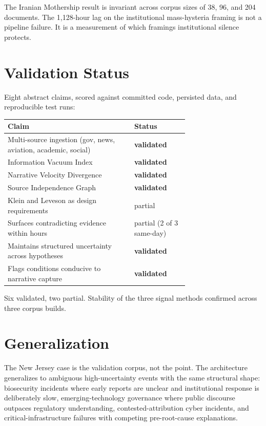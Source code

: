\documentclass[10pt, letterpaper]{article}
\begin{document}
The Iranian Mothership result is invariant across corpus sizes of 38, 96, and 204 documents.
The 1{,}128-hour lag on the institutional mass-hysteria framing is not a pipeline failure.
It is a measurement of which framings institutional silence protects.

\section{Validation Status}

Eight abstract claims, scored against committed code, persisted data, and reproducible test runs:

\begin{table}[h]
\renewcommand{\arraystretch}{1.1}
\small
\begin{tabular}{@{}p{0.7\linewidth} l@{}}
  \toprule
  \textbf{Claim} & \textbf{Status} \\
  \midrule
  Multi-source ingestion (gov, news, aviation, academic, social) & \textbf{validated} \\
  Information Vacuum Index & \textbf{validated} \\
  Narrative Velocity Divergence & \textbf{validated} \\
  Source Independence Graph & \textbf{validated} \\
  Klein and Leveson as design requirements & partial \\
  Surfaces contradicting evidence within hours & partial (2 of 3 same-day) \\
  Maintains structured uncertainty across hypotheses & \textbf{validated} \\
  Flags conditions conducive to narrative capture & \textbf{validated} \\
  \bottomrule
\end{tabular}
\end{table}

Six validated, two partial.
Stability of the three signal methods confirmed across three corpus builds.

\section{Generalization}

The New Jersey case is the validation corpus, not the point.
The architecture generalizes to ambiguous high-uncertainty events with the same structural shape: biosecurity incidents where early reports are unclear and institutional response is deliberately slow, emerging-technology governance where public discourse outpaces regulatory understanding, contested-attribution cyber incidents, and critical-infrastructure failures with competing pre-root-cause explanations.
\end{document}

